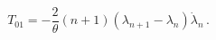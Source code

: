 \begin{equation}
T_{01} = -\frac2\theta(n+1)(\lambda_{n+1}-\lambda_n)\dot\lambda_n \,.
\end{equation}

